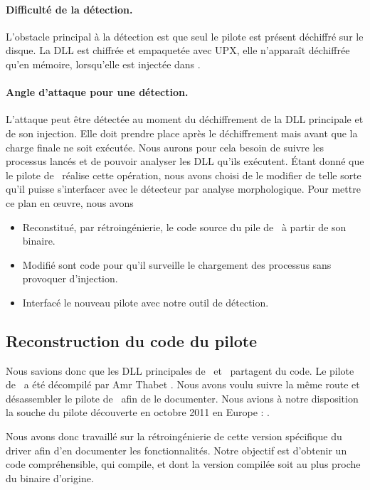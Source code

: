 \paragraph{Difficulté de la détection.}
L'obstacle principal à la détection est que seul le pilote est présent déchiffré sur le disque.
La DLL est chiffrée et empaquetée avec UPX, elle n'apparaît déchiffrée qu'en mémoire, lorsqu'elle est injectée dans \services.

\paragraph{Angle d'attaque pour une détection.}
L'attaque peut être détectée au moment du déchiffrement de la DLL principale et de son injection.
Elle doit prendre place après le déchiffrement mais avant que la charge finale ne soit exécutée.
Nous aurons pour cela besoin de suivre les processus lancés et de pouvoir analyser les DLL qu'ils exécutent.
Étant donné que le pilote de \duqu\ réalise cette opération, nous avons choisi de le modifier de telle sorte qu'il puisse s'interfacer avec le détecteur par analyse morphologique.
Pour mettre ce plan en \oe uvre, nous avons
\begin{itemize}
 \item Reconstitué, par rétroingénierie, le code source du pile de \duqu\ à partir de son binaire.
 \item Modifié sont code pour qu'il surveille le chargement des processus sans provoquer d'injection.
 \item Interfacé le nouveau pilote avec notre outil de détection.
\end{itemize}

\subsection{Reconstruction du code du pilote}
Nous savions donc que les DLL principales de \duqu\ et \stux\ partagent du code.
Le pilote de \stux\ a été décompilé par Amr Thabet \cite{ThabetDriver}.
Nous avons voulu suivre la même route et désassembler le pilote de \duqu\ afin de le documenter.
Nous avions à notre disposition la souche du pilote découverte en octobre 2011 en Europe : \driver.

Nous avons donc travaillé sur la rétroingénierie de cette version spécifique du driver afin d’en documenter les fonctionnalités. 
Notre objectif est d’obtenir un code compréhensible, qui compile, et dont la version compilée soit au plus proche du binaire d'origine.

